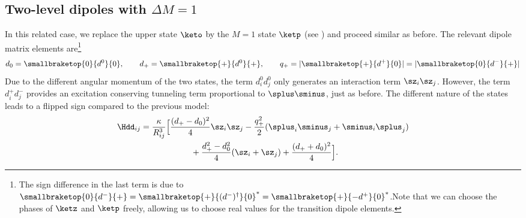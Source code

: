 
\subsection{Two-level dipoles with \texorpdfstring{$\Delta M = 1$}{dM = 1}}
In this related case, we replace the upper state $\keto$ by the $M=1$ state $\ketp$ (see ) and proceed similar as before.
The relevant dipole matrix elements are\footnote{The sign difference in the last term is due to $\smallbraketop{0}{d^-}{+} = \smallbraketop{+}{(d^-)^\dag}{0}^* = \smallbraketop{+}{- d^+}{0}^*$.Note that we can choose the phases of $\ketz$ and $\ketp$ freely, allowing us to choose real values for the transition dipole elements.}
\begin{align}
    d_0 = \smallbraketop{0}{d^0}{0},\qquad
    d_+ = \smallbraketop{+}{d^0}{+},\qquad
    q_+ = |\smallbraketop{+}{d^+}{0}| = |\smallbraketop{0}{d^-}{+}|
\end{align}
Due to the different angular momentum of the two states, the term $d^0_i d^0_j$ only generates an interaction term $\sz_i \sz_j$. However, the term $d^+_i d^-_j$ provides an excitation conserving tunneling term proportional to $\splus\sminus$, just as before. The different nature of the states leads to a flipped sign compared to the previous model:
\begin{align*}
    \Hdd_{ij} &= \frac{\kappa}{R_{ij}^3} \Big[ \frac{(d_+-d_0)^2}{4} \sz_i \sz_j  - \frac{q_+^2}{2} (\splus_i \sminus_j + \sminus_i \splus_j) \\
              &\qquad\qquad\qquad + \frac{d_+^2 - d_0^2}{4} (\sz_i + \sz_j)  + \frac{(d_++d_0)^2}{4} \Big].
\end{align*}

